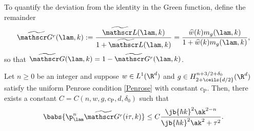 To quantify the deviation from the identity in the Green function, define the remainder
\begin{align*}
\widetilde {\mathscr G^r}(\lam,k):=\frac{\widetilde {\mathscr L}(\lam,k)}{1+\widetilde {\mathscr L}(\lam,k)}=\frac{\widehat w(k)m_g(\lam,k)}{1+\widehat w(k)m_g(\lam,k)},
\end{align*}so that $\widetilde {\mathscr G}(\lam,k)=1-\widetilde {\mathscr G^r}(\lam,k)$.

\begin{lemma}\label{Grdecay}
Let $n\geq0$ be an integer and suppose $w\in L^1(\R^d)$ and $g\in H^{n+3/2+\delta_0}_{2+\ceils{d/2}}(\R^d)$ satisfy the uniform Penrose condition \eqref{Penrose} with constant ${c_{\mathrm{P}}}$. Then, there exists a constant $C=C(n,w,g,{c_{\mathrm{P}}},d,\delta_0)$ such that
\begin{align*}
\babs{\p_\lam^n\widetilde {\mathscr G^r}(i\tau,k)}\leq C\frac{\jb{\hbar k}^2\ak^{2-n}}{\jb{\hbar k}^2\ak^2+\tau^2}.
\end{align*}
\end{lemma}
